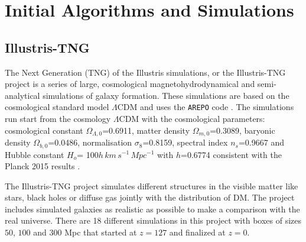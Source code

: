 \documentclass[usenatbib]{mnras}
\begin{document}
\section{Initial Algorithms and Simulations}\label{sec:init}

\subsection{Illustris-TNG}

The Next Generation (TNG) of the Illustris simulations, or the
Illustris-TNG project \citep{Nelson2015} is a series of large,
cosmological magnetohydrodynamical and semi-analytical simulations of galaxy formation. 
These simulations are based on the cosmological standard model
$\Lambda$CDM and uses the \texttt{AREPO} code \cite{Springel2011}.  The simulations run start from the cosmology $\Lambda$CDM with the cosmological parameters: cosmological constant $\Omega_{\Lambda,0}$=0.6911, matter density $\Omega_{m,0}$=0.3089,  baryonic density $\Omega_{b,0}$=0.0486, normalisation $\sigma_8$=0.8159, spectral index $n_s$=0.9667 and Hubble constant $H_o$= 100$h\,km\,s^{-1}\,Mpc^{-1}$ with $h$=0.6774 consistent with the Planck 2015 results \cite{Ade2016}. 

The Illustris-TNG project simulates different structures in the visible matter like stars, black holes or diffuse gas jointly with the distribution of DM.
The project includes simulated galaxies as realistic as possible to make a comparison with the real universe. There are 18 different simulations in this project with boxes of sizes $50$, $100$ and $300$ Mpc that started at $z=127$ and finalized at $z=0$.   
\end{document}
